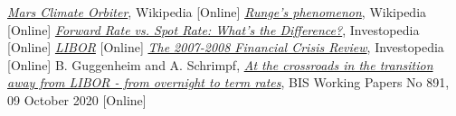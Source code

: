 \begin{thebibliography}{9}
	\href{https://en.wikipedia.org/wiki/Mars_Climate_Orbiter}{\emph{Mars Climate Orbiter}}, Wikipedia [Online]
	 \href{https://en.wikipedia.org/wiki/Runge\%27s_phenomenon}{\emph{Runge's phenomenon}}, Wikipedia [Online]
	\href{https://www.investopedia.com/ask/answers/042315/what-difference-between-forward-rate-and-spot-rate.asp}{\emph{Forward Rate vs. Spot Rate: What's the Difference?}}, Investopedia [Online]
	 \href{https://www.ig.com/it/glossario-trading/definizione-di-libor}{\emph{LIBOR}} [Online]
	 \href{https://www.investopedia.com/articles/economics/09/financial-crisis-review.asp}{\emph{The 2007-2008 Financial Crisis Review}}, Investopedia [Online]
	B. Guggenheim and A. Schrimpf, 
	\href{https://www.bis.org/publ/work891.htm}{\emph{At the crossroads in the transition away from LIBOR - from overnight to term rates}}, BIS Working Papers No 891, 09 October 2020 [Online]
\end{thebibliography}
